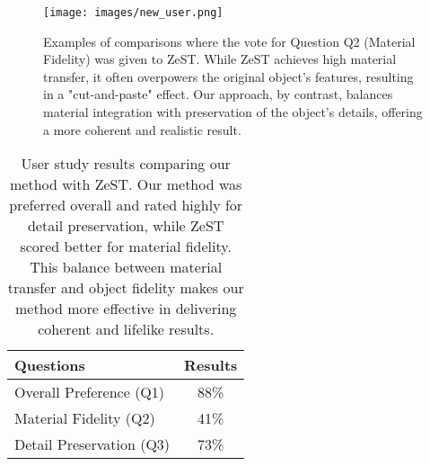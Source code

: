\begin{figure}[t]
  \centering
   \vspace{-15pt}
   \texttt{[image: images/new\_user.png]}

   \caption{Examples of comparisons where the vote for Question Q2 (Material Fidelity) was given to ZeST. While ZeST achieves high material transfer, it often overpowers the original object's features, resulting in a "cut-and-paste" effect. Our approach, by contrast, balances material integration with preservation of the object’s details, offering a more coherent and realistic result.}
   \label{fig:user_study}

   \vspace{-5pt}
\end{figure}


\begin{table}
    \vspace{-2pt}
  \caption{User study results comparing our method with ZeST. Our method was preferred overall and rated highly for detail preservation, while ZeST scored better for material fidelity. This balance between material transfer and object fidelity makes our method more effective in delivering coherent and lifelike results.}
  \label{tab:user_study}
  \centering
  \begin{tabular}{@{}lc@{}}
    \toprule
    Questions & Results \\
    \midrule
    Overall Preference (Q1) &  88\% \\
    Material Fidelity (Q2) & 41\% \\
    Detail Preservation (Q3) & 73\% \\
    \bottomrule
  \end{tabular}

  \vspace{-7pt}

\end{table}